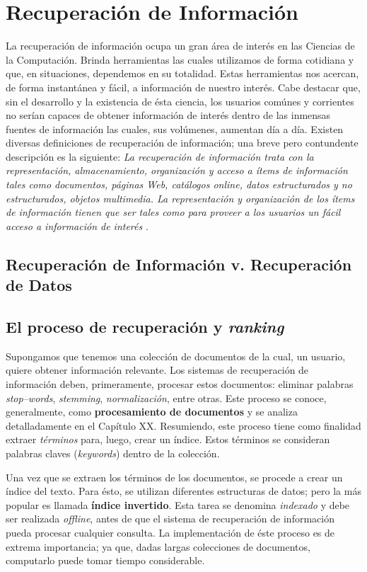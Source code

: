 \section{Recuperación de Información}
	La recuperación de información ocupa un gran área de interés en las Ciencias de la Computación. Brinda herramientas las cuales utilizamos de forma cotidiana y que, en situaciones, dependemos en su totalidad. Estas herramientas nos acercan, de forma instantánea y fácil, a información de nuestro interés. Cabe destacar que, sin el desarrollo y la existencia de ésta ciencia, los usuarios comúnes y corrientes no serían capaces de obtener información de interés dentro de las inmensas fuentes de información las cuales, sus volúmenes, aumentan día a día. Existen diversas definiciones de recuperación de información; una breve pero contundente descripción es la siguiente: \textit{La recuperación de información trata con la representación, almacenamiento, organización y acceso a ítems de información tales como documentos, páginas Web, catálogos online, datos estructurados y no estructurados, objetos multimedia. La representación y organización de los ítems de información tienen que ser tales como para proveer a los usuarios un fácil acceso a información de interés} \cite{baeza1999}.
	
	\subsection{Recuperación de Información v. Recuperación de Datos}
	
	\subsection{El proceso de recuperación y \textit{ranking}}
		Supongamos que tenemos una colección de documentos de la cual, un usuario, quiere obtener información relevante. Los sistemas de 		recuperación de información deben, primeramente, procesar estos documentos: eliminar palabras \textit{stop--words}, \textit{stemming}, \textit{normalización}, entre otras. Este proceso se conoce, generalmente, como \textbf{procesamiento de documentos} y se analiza detalladamente en el Capítulo XX. Resumiendo, este proceso tiene como finalidad extraer \textit{términos} para, luego, crear un índice. Estos términos se consideran palabras claves (\textit{keywords}) dentro de la colección. \par

		Una vez que se extraen los términos de los documentos, se procede a crear un índice del texto. Para ésto, se utilizan diferentes estructuras de datos; pero la más popular es llamada \textbf{índice invertido}. Esta tarea se denomina \textit{indexado} y debe ser realizada \textit{offline}, antes de que el sistema de recuperación de información pueda procesar cualquier consulta. La implementación de éste proceso es de extrema importancia; ya que, dadas largas colecciones de documentos, computarlo puede tomar tiempo considerable. \par

